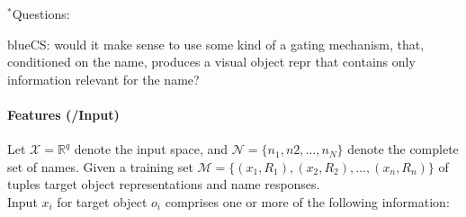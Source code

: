 \documentclass[11pt,a4paper]{article}
\newcommand{\cs}[1]{\begin{color}{blue}CS: #1\end{color}\xspace}
\begin{document}
\noindent
$^*$Questions:\\
\cs{would it make sense to use some kind of a gating mechanism, that, conditioned on the name, produces a visual object repr that contains only information relevant for the name?}


\paragraph{Features (/Input)}
Let $\mathcal{X} = \mathbb{R}^q$ denote the input space, and $\mathcal{N} = \{n_1, n2, \dots, n_N\}$ denote the complete set of names. 
Given a training set $\mathcal{M} = \{({ x_1},R_1), ({ x_2},R_2),\dots,({ x_n},R_n)\}$ of tuples target object representations and name responses. \\
Input ${x_i}$ for target object $o_i$ comprises one or more of the following information:
\end{document}
